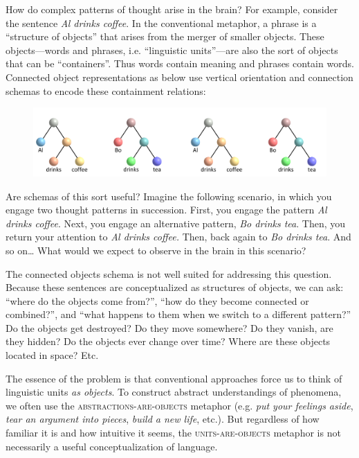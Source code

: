 How do complex patterns of thought arise in the brain? For example, consider the sentence \textit{Al drinks coffee}. In the conventional metaphor, a phrase is a “structure of objects” that arises from the merger of smaller objects. These objects—words and phrases, i.e. “linguistic units”—are also the sort of objects that can be “containers”. Thus words contain meaning and phrases contain words. Connected object representations as below use vertical orientation and connection schemas to encode these containment relations:

  
\begin{figure}
\includegraphics[width=\textwidth]{figures/Tilsen-img8.png}
\caption{\missingcaption}
\label{fig:}
\end{figure}
 

  Are schemas of this sort useful? Imagine the following scenario, in which you engage two thought patterns in succession. First, you engage the pattern \textit{Al drinks coffee}. Next, you engage an alternative pattern, \textit{Bo drinks tea}. Then, you return your attention to \textit{Al drinks coffee.} Then, back again to \textit{Bo drinks tea}. And so on… What would we expect to observe in the brain in this scenario? 

  The connected objects schema is not well suited for addressing this question. Because these sentences are conceptualized as structures of objects, we can ask: “where do the objects come from?”, “how do they become connected or combined?”, and “what happens to them when we switch to a different pattern?” Do the objects get destroyed? Do they move somewhere? Do they vanish, are they hidden? Do the objects ever change over time? Where are these objects located in space? Etc.

  The essence of the problem is that conventional approaches force us to think of linguistic units \textit{as objects}. To construct abstract understandings of phenomena, we often use the \textsc{abstractions-}\textsc{are}\textsc{{}-objects} metaphor (e.g. \textit{put your feelings aside}, \textit{tear an argument into pieces}, \textit{build a new life}, etc.). But regardless of how familiar it is and how intuitive it seems, the \textsc{units}\textsc{{}-are-}\textsc{objects} metaphor is not necessarily a useful conceptualization of language. 

